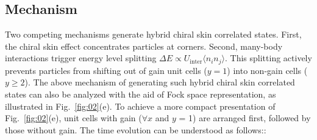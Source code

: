 \documentclass[longbibliography, aps, prx, amsmath, amssymb, amsfonts, twocolumn,superscriptaddress, footinbib]{revtex4-1}
\begin{document}
	\subsection{Mechanism}
	{
		Two competing mechanisms generate hybrid chiral skin correlated states. First, the chiral skin effect concentrates particles at corners. Second, many-body interactions trigger energy level splitting $\Delta E \propto U_{\text{inter}}\langle n_i n_j \rangle$. This splitting actively prevents particles from shifting out of gain unit cells (\(y = 1\)) into non-gain cells (\(y \ge 2\)).
	}
	The above mechanism of generating such hybrid chiral skin correlated states can also be analyzed with the aid of Fock space representation, as illustrated in Fig.~\ref{fig:02}(e). 
	To achieve a more compact presentation of Fig.~\ref{fig:02}(e), unit cells with gain ($\forall x$ and $y$ = 1) are arranged first, followed by those without gain. The time evolution can be understood as follows::
\end{document}
